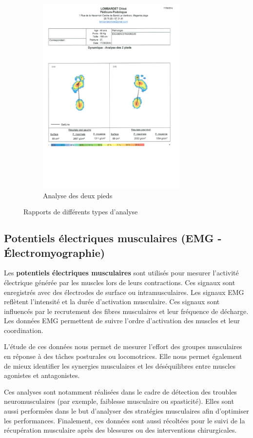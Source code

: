 \begin{figure}[H]
\begin{subfigure}[b]{0.4\linewidth}
    \centering
    \includegraphics[width=\textwidth, height=10cm]{images/analyse_2_pieds.png}
    \caption{Analyse des deux pieds}
    \label{fig:analyse_2_pieds}
  \end{subfigure}
  \caption{Rapports de différents types d'analyse}
  \label{fig:3_type_analyse}
\end{figure}

\subsection{Potentiels électriques musculaires (EMG - Électromyographie)}

Les \textbf{potentiels électriques musculaires} sont utilisés pour mesurer l'activité électrique
générée par les muscles lors de leurs contractions. Ces signaux sont enregistrés avec des électrodes de surface ou intramusculaires.
Les signaux EMG reflètent l'intensité et la durée d'activation musculaire.
Ces signaux sont influencés par le recrutement des fibres musculaires et leur fréquence de décharge.
Les données EMG permettent de suivre l'ordre d'activation des muscles et leur coordination.

L'étude de ces données nous permet de mesurer l'effort des groupes musculaires en réponse à des tâches posturales ou locomotrices.
Elle nous permet également de mieux identifier les synergies musculaires et les déséquilibres entre muscles agonistes et antagonistes.

Ces analyses sont notamment réalisées dans le cadre de détection des troubles neuromusculaires (par exemple, faiblesse musculaire ou spasticité).
Elles sont aussi performées dans le but d'analyser des stratégies musculaires afin d'optimiser les performances.
Finalement, ces données sont aussi récoltées pour le suivi de la récupération musculaire après des blessures ou des interventions chirurgicales.
 
